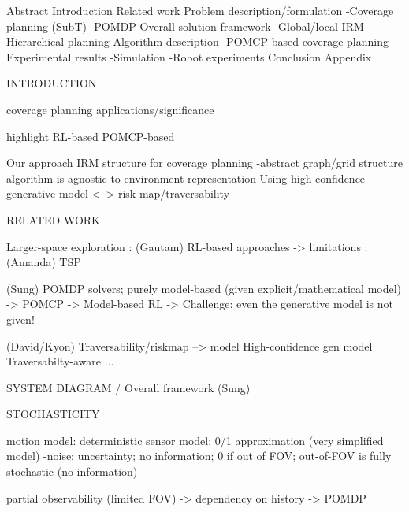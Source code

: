 \documentclass{article}
\begin{document}






Abstract
Introduction
Related work
Problem description/formulation
-Coverage planning (SubT)
-POMDP
Overall solution framework
-Global/local IRM
-Hierarchical planning
Algorithm description
-POMCP-based coverage planning
Experimental results
-Simulation
-Robot experiments
Conclusion
Appendix



INTRODUCTION

coverage planning applications/significance

highlight
RL-based
POMCP-based

Our approach
IRM structure for coverage planning
-abstract graph/grid structure algorithm is agnostic to environment representation
Using high-confidence generative model <--> risk map/traversability


RELATED WORK

Larger-space exploration
: (Gautam) RL-based approaches
-> limitations
: (Amanda) TSP


(Sung) POMDP solvers; purely model-based (given explicit/mathematical model)
-> POMCP -> Model-based RL
-> Challenge: even the generative model is not given!


(David/Kyon)
Traversability/riskmap --> model
High-confidence gen model
Traversabilty-aware ...



SYSTEM DIAGRAM / Overall framework (Sung)




STOCHASTICITY

motion model: deterministic
sensor model: 0/1 approximation (very simplified model)
-noise; uncertainty; no information; 0 if out of FOV; out-of-FOV is fully stochastic (no information)

partial observability (limited FOV)
-> dependency on history
-> POMDP
\end{document}
